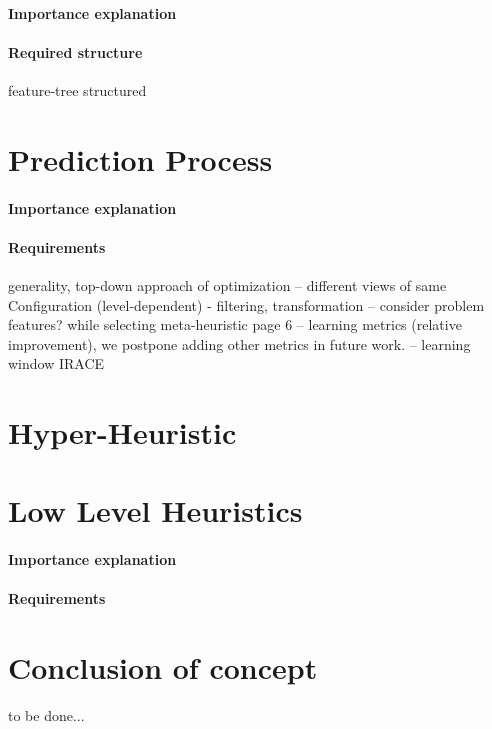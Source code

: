 \paragraph{Importance explanation}
\paragraph{Required structure} feature-tree structured



\section{Prediction Process}\label{concept:prediction}
\paragraph{Importance explanation}
\paragraph{Requirements} generality, top-down approach of optimization
-- different views of same Configuration (level-dependent) - filtering, transformation
-- consider problem features? while selecting meta-heuristic \cite{kerschke2019automated} page 6
-- learning metrics (relative improvement), we postpone adding other metrics in future work.
-- learning window
IRACE\cite{lopez2016irace}

\section{Hyper-Heuristic}

\section{Low Level Heuristics}\label{concept: llh}
\paragraph{Importance explanation}
\paragraph{Requirements}


\section{Conclusion of concept}
to be done...